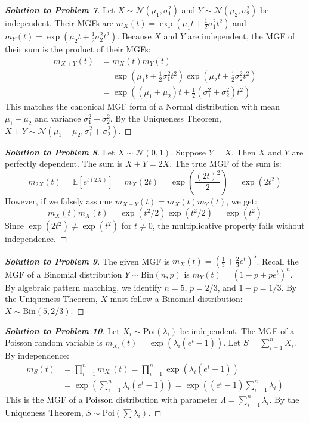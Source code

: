 \documentclass[11pt, a4paper]{article}
\theoremstyle{definition}
\theoremstyle{remark}
\newcommand{\E}{\mathbb{E}}
\begin{document}
\begin{proof}[\textbf{Solution to Problem 7}]
Let $X \sim \mathcal{N}(\mu_1, \sigma_1^2)$ and $Y \sim \mathcal{N}(\mu_2, \sigma_2^2)$ be independent. Their MGFs are $m_X(t) = \exp(\mu_1 t + \frac{1}{2}\sigma_1^2 t^2)$ and $m_Y(t) = \exp(\mu_2 t + \frac{1}{2}\sigma_2^2 t^2)$.
Because $X$ and $Y$ are independent, the MGF of their sum is the product of their MGFs:
\begin{align*}
m_{X+Y}(t) &= m_X(t) m_Y(t) \\
&= \exp\left(\mu_1 t + \frac{1}{2}\sigma_1^2 t^2\right) \exp\left(\mu_2 t + \frac{1}{2}\sigma_2^2 t^2\right) \\
&= \exp\left( (\mu_1 + \mu_2)t + \frac{1}{2}(\sigma_1^2 + \sigma_2^2)t^2 \right)
\end{align*}
This matches the canonical MGF form of a Normal distribution with mean $\mu_1+\mu_2$ and variance $\sigma_1^2+\sigma_2^2$. By the Uniqueness Theorem, $X+Y \sim \mathcal{N}(\mu_1+\mu_2, \sigma_1^2+\sigma_2^2)$.
\end{proof}

\begin{proof}[\textbf{Solution to Problem 8}]
Let $X \sim \mathcal{N}(0,1)$. Suppose $Y = X$. Then $X$ and $Y$ are perfectly dependent.
The sum is $X+Y = 2X$. The true MGF of the sum is:
\[ m_{2X}(t) = \E[e^{t(2X)}] = m_X(2t) = \exp\left(\frac{(2t)^2}{2}\right) = \exp(2t^2) \]
However, if we falsely assume $m_{X+Y}(t) = m_X(t)m_Y(t)$, we get:
\[ m_X(t)m_X(t) = \exp(t^2/2) \exp(t^2/2) = \exp(t^2) \]
Since $\exp(2t^2) \neq \exp(t^2)$ for $t \neq 0$, the multiplicative property fails without independence.
\end{proof}

\begin{proof}[\textbf{Solution to Problem 9}]
The given MGF is $m_X(t) = \left(\frac{1}{3} + \frac{2}{3}e^t\right)^5$.
Recall the MGF of a Binomial distribution $Y \sim \text{Bin}(n, p)$ is $m_Y(t) = (1-p + pe^t)^n$.
By algebraic pattern matching, we identify $n = 5$, $p = 2/3$, and $1-p = 1/3$.
By the Uniqueness Theorem, $X$ must follow a Binomial distribution: $X \sim \text{Bin}(5, 2/3)$.
\end{proof}

\begin{proof}[\textbf{Solution to Problem 10}]
Let $X_i \sim \text{Poi}(\lambda_i)$ be independent. The MGF of a Poisson random variable is $m_{X_i}(t) = \exp(\lambda_i(e^t - 1))$.
Let $S = \sum_{i=1}^n X_i$. By independence:
\begin{align*}
m_S(t) &= \prod_{i=1}^n m_{X_i}(t) = \prod_{i=1}^n \exp(\lambda_i(e^t - 1)) \\
&= \exp\left( \sum_{i=1}^n \lambda_i(e^t - 1) \right) = \exp\left( (e^t - 1) \sum_{i=1}^n \lambda_i \right)
\end{align*}
This is the MGF of a Poisson distribution with parameter $\Lambda = \sum_{i=1}^n \lambda_i$. By the Uniqueness Theorem, $S \sim \text{Poi}(\sum \lambda_i)$.
\end{proof}
\end{document}
